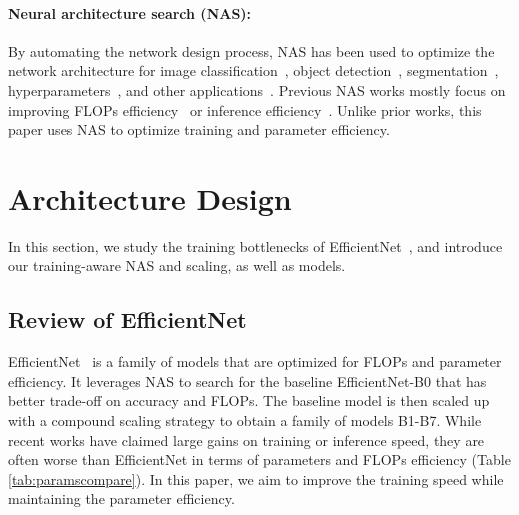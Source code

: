 \documentclass{article}
\begin{document}
\paragraph{Neural architecture search (NAS):}
By automating the network design process, NAS has been used to optimize the network architecture for image classification~\cite{nas_imagenet18}, object detection~\cite{detnas19,efficientdet20}, segmentation~\cite{autodeeplab19}, hyperparameters~\cite{autohas20}, and other applications~\cite{elsken2019neural}. Previous NAS works mostly focus on improving FLOPs efficiency~\cite{mixconv19,efficientnet19} or inference efficiency~\cite{mnas19,proxyless19,fbnet19,efficientnetx21}. Unlike prior works, this paper uses NAS to optimize training and parameter efficiency.  \section{{\xnet} Architecture Design}
\label{sec:xnet}

In this section, we study the training bottlenecks of EfficientNet~\cite{efficientnet19}, and introduce our training-aware NAS and scaling, as well as {\xnet} models.

\subsection{Review of EfficientNet}
EfficientNet~\cite{efficientnet19} is a family of models that are optimized for FLOPs and parameter efficiency. It leverages NAS to search for the baseline EfficientNet-B0 that has better trade-off on accuracy and FLOPs. The baseline model is then scaled up with a compound scaling strategy to obtain a family of models B1-B7.
While recent works have claimed large gains on training or inference speed, they are often worse than EfficientNet in terms of parameters and FLOPs efficiency (Table \ref{tab:paramscompare}). 
In this paper, we aim to improve the training speed while  maintaining the parameter efficiency.

\begin{table}[h]
    \vskip -0.15in
    \centering
    \caption{EfficientNets have good parameter and FLOPs efficiency.}
    \vskip -0.1in
\label{tab:paramscompare}
\end{table} 
\end{document}
